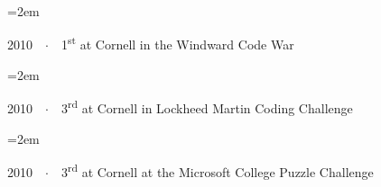 \documentclass[a4paper]{scrartcl}
\newcommand{\Description}[1]{\hangindent=2em\hangafter=0\noindent\raggedright\footnotesize{#1}\par\normalsize\vspace{1em}} %
\begin{document}
\begin{cv}{}
\Description{2010\ \ $\cdotp$\ \ 1\textsuperscript{st} at Cornell in the Windward Code War}

\vspace{-0.5em} %

\Description{2010\ \ $\cdotp$\ \ 3\textsuperscript{rd} at Cornell in Lockheed Martin Coding Challenge}

\vspace{-0.5em} %

\Description{2010\ \ $\cdotp$\ \ 3\textsuperscript{rd} at Cornell at the Microsoft College Puzzle Challenge}


\end{cv}
\end{document}
